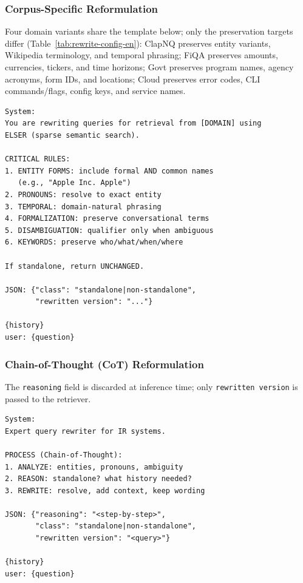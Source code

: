 \subsubsection{Corpus-Specific Reformulation}
Four domain variants share the template below; only the preservation targets differ (Table~\ref{tab:rewrite-config-en}): ClapNQ preserves entity variants, Wikipedia terminology, and temporal phrasing; FiQA preserves amounts, currencies, tickers, and time horizons; Govt preserves program names, agency acronyms, form IDs, and locations; Cloud preserves error codes, CLI commands/flags, config keys, and service names.
\begin{verbatim}
System:
You are rewriting queries for retrieval from [DOMAIN] using 
ELSER (sparse semantic search).

CRITICAL RULES:
1. ENTITY FORMS: include formal AND common names 
   (e.g., "Apple Inc. Apple")
2. PRONOUNS: resolve to exact entity
3. TEMPORAL: domain-natural phrasing
4. FORMALIZATION: preserve conversational terms
5. DISAMBIGUATION: qualifier only when ambiguous
6. KEYWORDS: preserve who/what/when/where

If standalone, return UNCHANGED.

JSON: {"class": "standalone|non-standalone",
       "rewritten version": "..."}

{history}
user: {question}
\end{verbatim}

\subsubsection{Chain-of-Thought (CoT) Reformulation}
The \texttt{reasoning} field is discarded at inference time; only \texttt{rewritten version} is passed to the retriever.
\begin{verbatim}
System:
Expert query rewriter for IR systems.

PROCESS (Chain-of-Thought):
1. ANALYZE: entities, pronouns, ambiguity
2. REASON: standalone? what history needed?
3. REWRITE: resolve, add context, keep wording

JSON: {"reasoning": "<step-by-step>",
       "class": "standalone|non-standalone",
       "rewritten version": "<query>"}

{history}
user: {question}
\end{verbatim}

